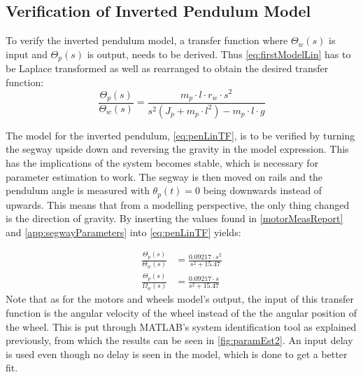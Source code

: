 \subsection{Verification of Inverted Pendulum Model \label{sec:varificationpen}}
To verify the inverted pendulum model, a transfer function where $\Theta_w(s)$ is input and $\Theta_p(s)$ is output, needs to be derived. Thus \autoref{eq:firstModelLin} has to be Laplace transformed as well as rearranged to obtain the desired transfer function:
\begin{equation}
\frac{\Theta_p(s)}{\Theta_w(s)} = \frac{m_p \cdot l \cdot r_w \cdot s^2}{s^2 (J_p + m_p \cdot l^2) - m_p \cdot l \cdot g}\label{eq:penLinTF}
\end{equation}

The model for the inverted pendulum, \autoref{eq:penLinTF}, is to be verified by turning the segway upside down and reversing the gravity in the model expression. This has the implications of the system becomes stable, which is necessary for parameter estimation to work. The segway is then moved on rails and the pendulum angle is measured with $\theta_p(t) = 0$ being downwards instead of upwards. This means that from a modelling perspective, the only thing changed is the direction of gravity. By inserting the values found in \autoref{motorMeasReport} and \autoref{app:segwayParameters} into \autoref{eq:penLinTF} yields:

\begin{align}
\frac{\Theta_p(s)}{\Theta_w(s)}&=\frac{0.09217\cdot s^2}{s^2 + 15.47}\\
\frac{\Theta_p(s)}{\Omega_w(s)}&=\frac{0.09217\cdot s}{s^2 + 15.47}
\end{align}
Note that as for the motors and wheels model's output, the input of this transfer function is the angular velocity of the wheel instead of the the angular position of the wheel.
This is put through MATLAB's system identification tool as explained previously, from which the results can be seen in \autoref{fig:paramEst2}. An input delay is used even though no delay is seen in the model, which is done to get a better fit. 

